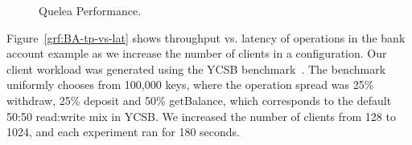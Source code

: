 \begin{figure}
  \centering
	\caption{Quelea Performance.}
  \label{grf:LWW_perf}
\end{figure}

Figure~\ref{grf:BA-tp-vs-lat} shows throughput vs. latency of operations in the
bank account example as we increase the number of clients in a 
configuration. Our client workload was generated using the YCSB
benchmark~\cite{YCSB}. The benchmark uniformly chooses from 100,000 keys, where
the operation spread was 25\% withdraw, 25\% deposit and 50\% getBalance, which
corresponds to the default 50:50 read:write mix in YCSB. We increased the
number of clients from 128 to 1024, and each experiment ran for 180 seconds.

